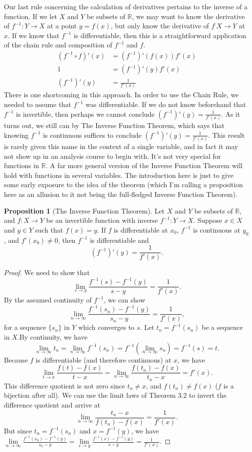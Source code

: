 \documentclass{article}
\newcommand{\R}{\mathbb{R}}
\theoremstyle{definition}
\newtheorem{proposition}{Proposition}[section]
\begin{document}
Our last rule concerning the calculation of derivatives pertains to the inverse of a function. If we let $ X $ and $ Y $ be subsets of $ \R $, we may want to know the derivative of $ f^{-1}:Y\to X $ at a point $ y=f(x) $, but only know the derivative of $ f^:X\to Y $ at $ x $. If we know that $ f^{-1} $ is differentiable, then this is a straightforward application of the chain rule and composition of $ f^{-1} $ and $ f $. 
\begin{align*}
	(f^{-1}\circ f)'(x)&=(f^{-1})'(f(x))f'(x)\\
	1&=(f^{-1})'(y)f'(x)\\
	(f^{-1})'(y)&=\frac{1}{f'(x)}
\end{align*} 
There is one shortcoming in this approach. In order to use the Chain Rule, we needed to assume that $ f^{-1} $ was differentiable. If we do not know beforehand that $ f^{-1} $ is invertible, then perhaps we cannot conclude $ (f^{-1})'(y)=\frac{1}{f'(x)}  $. As it turns out, we still can by The Inverse Function Theorem, which says that knowing $ f^{-1} $ is continuous suffices to conclude $ (f^{-1})'(y)=\frac{1}{f'(x)}  $. This result is rarely given this name in the context of a single variable, and in fact it may not show up in an analysis course to begin with. It's not very special for functions in $ \R $. A far more general version of the Inverse Function Theorem will hold with functions in several variables. The introduction here is just to give some early exposure to the idea of the theorem (which I'm calling a proposition here as an allusion to it not being the full-fledged Inverse Function Theorem).  
\begin{proposition}[The Inverse Function Theorem]
 Let $ X $ and $ Y $ be subsets of $ \R $, and $ f:X\to Y $ be an invertible function with inverse $ f^{-1}:Y\to X $. Suppose $ x\in X $ and $ y\in Y $ such that $ f(x)=y $. If $ f $ is differentiable at $ x_0 $, $ f^{-1} $ is continuous at $ y_0 $, and $ f'(x_0)\neq 0 $, then $ f^{-1} $ is differentiable and $$ (f^{-1})'(y)=\frac{1}{f'(x)}.$$
\end{proposition}
\begin{proof}
	We need to show that $$\lim\limits_{s\to y}\frac{f^{-1}(s)-f^{-1}(y)}{s-y}=\frac{1}{f'(x)} .$$ By the assumed continuity of $ f^{-1} $, we can show  $$\lim\limits_{n\to \infty}\frac{f^{-1}(s_n)-f^{-1}(y)}{s_n-y}=\frac{1}{f'(x)},$$ for a sequence $ \{s_n\} $ in $ Y $ which converges to $ s $. Let $ t_n=f^{-1}(s_n) $ be a sequence in $ X $.By continuity, we have $$\lim_{n\to\infty} t_n=\lim_{n\to\infty} f^{-1}(s_n)=  f^{-1}\left(\lim_{n\to\infty}s_n \right)=f^{-1}(s)=t.$$ Because $ f $ is differentiable (and therefore continuous) at $ x $, we have $$\lim\limits_{t\to x}\frac{f(t)-f(x)}{t-x}=\lim_{n\to\infty}\frac{f(t_n)-f(x)}{t_n-x}=f'(x) .$$ This difference quotient is not zero since $ t_n\neq x $, and $ f(t_n)\neq f(x) $ ($ f $ is a bijection after all). We can use the limit laws of Theorem 3.2 to invert the difference quotient and arrive at $$ \lim_{n\to\infty}\frac{t_n-x}{f(t_n)-f(x)}=\frac{1}{f'(x)}.$$ But since $  t_n=f^{-1}(s_n) $ and $ x=f^{-1}(y) $, we have $ \lim\limits_{n\to \infty}\frac{f^{-1}(s_n)-f^{-1}(y)}{s_n-y}=\lim\limits_{s\to y}\frac{f^{-1}(s)-f^{-1}(y)}{s-y}=\frac{1}{f'(x)} .$
\end{proof}
\end{document}
